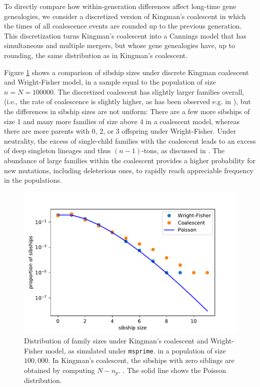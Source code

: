 \documentclass[9pt,twocolumn,twoside,lineno]{gsajnl}
\begin{document}
To directly compare how within-generation differences affect long-time gene genealogies, 
we consider a discretized version of Kingman's coalescent in which the times of 
all coalescence events are rounded up to the previous generation. 
This discretization turns Kingman's coalescent into a Cannings model that has simultaneous and 
multiple mergers, but whose gene genealogies have, up to rounding, the same distribution as in 
Kingman's coalescent. 

Figure \ref{sibships} shows a comparison of sibship sizes under discrete Kingman coalescent 
and Wright-Fisher model, in a sample equal to the population of size $n=N=100 000$. 
The discretized coalescent has slightly larger families overall,
 (i.e., the rate of coalescence is slightly higher, as has been observed e.g. in \cite{Fu2006}), but 
the differences in sibship sizes are not uniform: There are a few more sibships of size 1 and many more families of size above 4 
in a coalescent model, whereas there are more parents with 0, 2, or 3 offspring under Wright-Fisher. Under neutrality, 
the excess of single-child families with the coalescent leads to an excess of deep singleton lineages and thus $(n-1)$-tons,
as discussed in \cite{Fu2006}. The abundance of large families within the coalescent provides a higher probability for
 new mutations, including deleterious ones, to rapidly reach appreciable frequency in the populations.
 
 \begin{figure}
  \centering
  \includegraphics[width=\columnwidth]{fig/familysizes.pdf}

  \caption{Distribution of family sizes under Kingman's coalescent and Wright-Fisher model, as
     simulated under \texttt{msprime}.
  \cite{Nelson2020} in a population of size $100,000$. In Kingman's coalescent, the sibships with zero 
  siblings are obtained by computing $N-n_p.$ \label{sibships}. The solid line shows the Poisson distribution.}


\end{figure}
 
\end{document}
